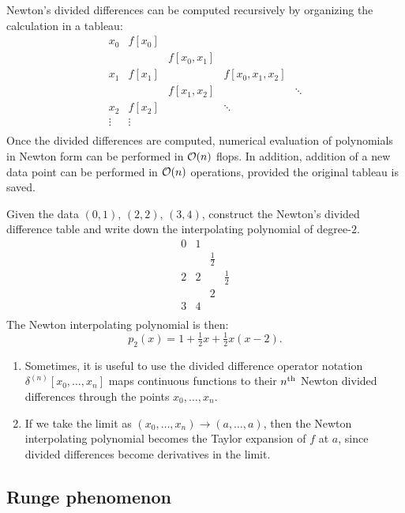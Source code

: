 Newton's divided differences can be computed recursively by organizing the calculation in a tableau:
\[
\begin{array}{cclll}
x_0 & f[x_0] & & & \\
& & f[x_0,x_1] & & \\
x_1 & f[x_1] & & f[x_0,x_1,x_2] &\\
& & f[x_1,x_2] & & \ddots\\
x_2 & f[x_2] & & \ddots & \\
\vdots & \vdots & & & \\
\end{array}
\]
Once the divided differences are computed, numerical evaluation of polynomials in Newton form can be performed in $\mathcal{O}(n)$ flops. In addition, addition of a new data point can be performed in $\mathcal{O}(n)$ operations, provided the original tableau is saved.

\begin{example}
Given the data $(0,1)$, $(2,2)$, $(3,4)$, construct the Newton's divided difference table and write down the interpolating polynomial of degree-$2$.
\[
\begin{array}{cccc}
0 & 1 & & \\
& & \tfrac{1}{2} & \\
2 & 2 & & \tfrac{1}{2}\\
& & 2 &\\
3 & 4 & & \\
\end{array}
\]
The Newton interpolating polynomial is then:
\[
p_2(x) = 1 + \tfrac{1}{2}x + \tfrac{1}{2}x(x-2).
\]
\end{example}

\begin{remark}
\begin{enumerate}
\item Sometimes, it is useful to use the divided difference operator notation $\delta^{(n)}[x_0,\ldots,x_n]$ maps continuous functions to their $n^{\rm th}$ Newton divided differences through the points $x_0,\ldots,x_n$.
\item If we take the limit as $(x_0,\ldots,x_n)\to(a,\ldots,a)$, then the Newton interpolating polynomial becomes the Taylor expansion of $f$ at $a$, since divided differences become derivatives in the limit.
\end{enumerate}
\end{remark}

\subsection{Runge phenomenon}

